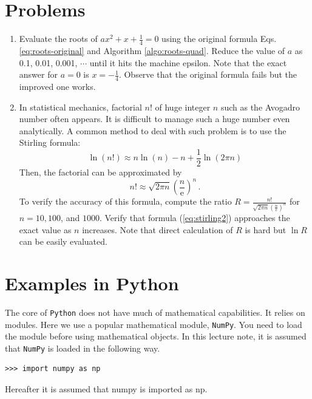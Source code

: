 \bigskip

\noindent
\section*{Problems}

\begin{enumerate}[labelwidth=0.5cm,labelindent=0.0cm,leftmargin=*,label=\bfseries \thechapter.\arabic*,align=left]
\item
Evaluate the roots of $a x^2 + x + \displaystyle\frac{1}{4} = 0$ using the original formula Eqs. \eqref{eq:roots-original} and Algorithm \ref{algo:roots-quad}. Reduce the value of $a$ as 0.1, 0.01, 0.001, $\cdots$ until it hits the machine epsilon. Note that the exact answer for $a=0$ is $x=-\displaystyle\frac{1}{4}$.  Observe that the original formula fails but the improved one works.
\item In statistical mechanics, factorial $n!$ of huge integer $n$ such as the Avogadro number often appears. It is difficult to manage such a huge number even analytically.  A common method to deal with such problem is to use the Stirling formula\cite{Zwillinger2012}:
\begin{equation}
\ln(n!) \approx n \ln(n) - n + \frac{1}{2} \ln(2 \pi n)
\label{eq:stirling1}
\end{equation}
Then, the factorial can be approximated by
\begin{equation}
n! \approx \sqrt{2 \pi n} \left ( \frac{n}{\text{e}} \right )^n\, .
\label{eq:stirling2}
\end{equation}
To verify the accuracy of this formula, compute the ratio $R=\displaystyle\frac{n!}{\sqrt{2 \pi n} \left ( \frac{n}{\text{e}} \right )^n}$  for $n=10, 100$, and $1000$.  Verify that formula (\ref{eq:stirling2}) approaches the exact value as $n$ increases. Note that direct calculation of $R$ is hard but $\ln R$ can be easily evaluated.
\end{enumerate}


\vspace{1 in}
\noindent
\section*{Examples in Python}


The core of \texttt{Python} does not have much of mathematical capabilities. It relies on modules.  Here we use a popular mathematical module, \texttt{NumPy}.
You need to load the module before using mathematical objects. In this lecture note, it is assumed that \texttt{NumPy} is loaded in the following way.
\small
\begin{mybox}
	\begin{verbatim}
>>> import numpy as np
   \end{verbatim}
\end{mybox}
\normalsize
Hereafter it is assumed that numpy is imported as np.

